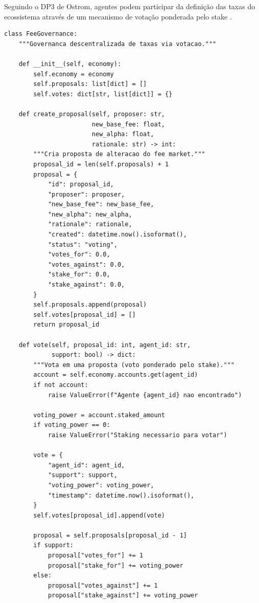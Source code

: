 Seguindo o DP3 de Ostrom, agentes podem participar da definição
das taxas do ecossistema através de um mecanismo de votação
ponderada pelo stake \cite{opencode2026token,
ostrom1990governing}.

\begin{lstlisting}[caption={Governanca descentralizada de taxas},
                  label={lst:governanca-taxas}]
class FeeGovernance:
    """Governanca descentralizada de taxas via votacao."""

    def __init__(self, economy):
        self.economy = economy
        self.proposals: list[dict] = []
        self.votes: dict[str, list[dict]] = {}

    def create_proposal(self, proposer: str,
                        new_base_fee: float,
                        new_alpha: float,
                        rationale: str) -> int:
        """Cria proposta de alteracao do fee market."""
        proposal_id = len(self.proposals) + 1
        proposal = {
            "id": proposal_id,
            "proposer": proposer,
            "new_base_fee": new_base_fee,
            "new_alpha": new_alpha,
            "rationale": rationale,
            "created": datetime.now().isoformat(),
            "status": "voting",
            "votes_for": 0.0,
            "votes_against": 0.0,
            "stake_for": 0.0,
            "stake_against": 0.0,
        }
        self.proposals.append(proposal)
        self.votes[proposal_id] = []
        return proposal_id

    def vote(self, proposal_id: int, agent_id: str,
             support: bool) -> dict:
        """Vota em uma proposta (voto ponderado pelo stake)."""
        account = self.economy.accounts.get(agent_id)
        if not account:
            raise ValueError(f"Agente {agent_id} nao encontrado")

        voting_power = account.staked_amount
        if voting_power == 0:
            raise ValueError("Staking necessario para votar")

        vote = {
            "agent_id": agent_id,
            "support": support,
            "voting_power": voting_power,
            "timestamp": datetime.now().isoformat(),
        }
        self.votes[proposal_id].append(vote)

        proposal = self.proposals[proposal_id - 1]
        if support:
            proposal["votes_for"] += 1
            proposal["stake_for"] += voting_power
        else:
            proposal["votes_against"] += 1
            proposal["stake_against"] += voting_power


\end{lstlisting}

